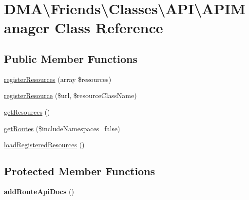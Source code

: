 \hypertarget{classDMA_1_1Friends_1_1Classes_1_1API_1_1APIManager}{}\section{D\+M\+A\textbackslash{}Friends\textbackslash{}Classes\textbackslash{}A\+P\+I\textbackslash{}A\+P\+I\+Manager Class Reference}
\label{classDMA_1_1Friends_1_1Classes_1_1API_1_1APIManager}
\subsection*{Public Member Functions}
\begin{DoxyCompactItemize}
\item 
\hyperlink{classDMA_1_1Friends_1_1Classes_1_1API_1_1APIManager_a7f1a8fb5292558288b627ca0d05939ab}{register\+Resources} (array \$resources)
\item 
\hyperlink{classDMA_1_1Friends_1_1Classes_1_1API_1_1APIManager_a4840b21b124bdd3640f33d52511defdf}{register\+Resource} (\$url, \$resource\+Class\+Name)
\item 
\hyperlink{classDMA_1_1Friends_1_1Classes_1_1API_1_1APIManager_aeafe3f85b5ab18331264fb4ce04085c0}{get\+Resources} ()
\item 
\hyperlink{classDMA_1_1Friends_1_1Classes_1_1API_1_1APIManager_a38dc407ea186640c86b96caf7b908df3}{get\+Routes} (\$include\+Namespaces=false)
\item 
\hyperlink{classDMA_1_1Friends_1_1Classes_1_1API_1_1APIManager_a03303291e15aa07cb42c99f051a319c5}{load\+Registered\+Resources} ()
\end{DoxyCompactItemize}
\subsection*{Protected Member Functions}
\begin{DoxyCompactItemize}
\item 
\hypertarget{classDMA_1_1Friends_1_1Classes_1_1API_1_1APIManager_adbb2b83cd96ee99eb25462348fd63cb5}{}{\bfseries add\+Route\+Api\+Docs} ()\label{classDMA_1_1Friends_1_1Classes_1_1API_1_1APIManager_adbb2b83cd96ee99eb25462348fd63cb5}

\end{DoxyCompactItemize}


